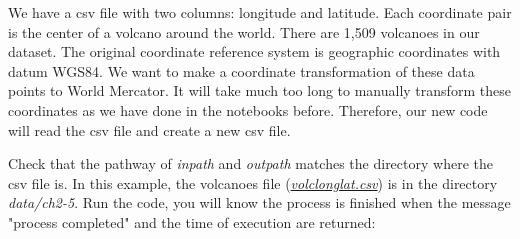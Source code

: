 \documentclass[a4paper , 12pt]{book}
\begin{document}
We have a csv file with two columns: longitude and latitude. Each coordinate pair is the center of a volcano around the world. There are 1,509 volcanoes in our dataset. The original coordinate reference system is geographic coordinates with datum WGS84. We want to make a coordinate transformation of these data points to World Mercator. It will take much too long to manually transform these coordinates as we have done in the notebooks before. Therefore, our new code will read the csv file and create a new csv file.

Check that the pathway of \textit{in\textunderscore path} and \textit{out\textunderscore path} matches the directory where the csv file is. In this example, the volcanoes file (\href{https://github.com/nfcd/compGeo/blob/master/source/data/ch2-5/volc_longlat.csv}{\textit{volc\textunderscore longlat.csv}}) is in the directory \textit{data/ch2-5}. Run the code, you will know the process is finished when the message "process completed" and the time of execution are returned:
\end{document}
